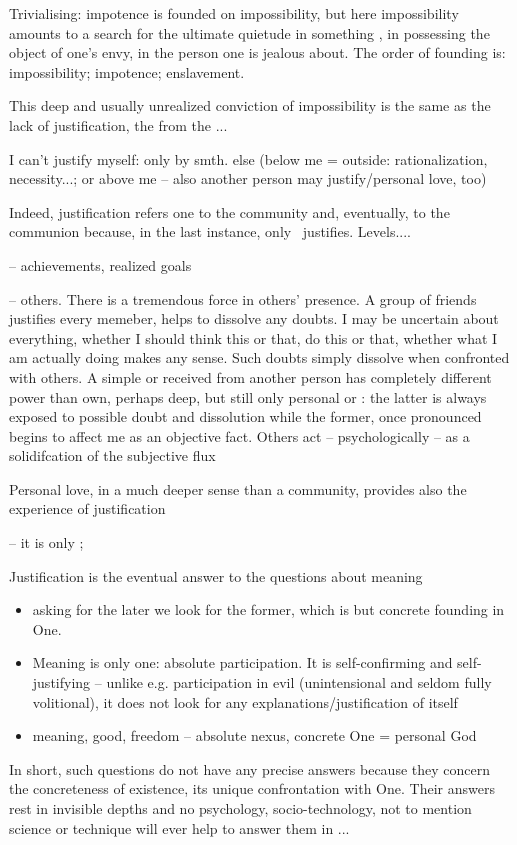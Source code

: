 Trivialising: impotence is founded on impossibility, but here impossibility
amounts to a search for the ultimate quietude in something , in
possessing the object of one's envy, in  the person one is
jealous about. The order of founding is: \inv impossibility; \mine impotence;
\act enslavement.

This deep and usually unrealized conviction of impossibility is the same as the
lack of justification, the  from the ...


\pa
I can't justify myself: only by smth. else (below me = outside: rationalization,
necessity...; or above me -- also another person may justify/personal love, too)

Indeed, justification refers one to the community and, eventually, to the
communion because, in the last instance, only \yes\ justifies. Levels....

\act -- achievements, realized goals

\mine -- others. There is a tremendous force in others' presence. A group of
friends justifies every memeber, helps to dissolve any doubts. I may be
uncertain about everything, whether I should think this or that, do this or
that, whether what I am actually doing makes any sense. Such doubts simply
dissolve when confronted with others. A simple  or  received from
another person has completely different power than  own, perhaps deep,
but still only personal  or : the latter is always exposed to
possible doubt and dissolution while the former, once pronounced begins to
affect me as an objective fact. Others act -- psychologically -- as a
solidifcation of the subjective flux

Personal love, in a much deeper sense than a community, provides also the
experience of justification

\inv -- it is only \Yes; 

\pa
Justification is the eventual answer to the questions about meaning
\begin{itemize}
  \item asking
for the later we look for the former, which is but concrete founding in
One.
\item Meaning is only one: absolute participation. It is self-confirming and
self-justifying -- unlike e.g. participation in evil (unintensional and seldom
fully volitional), it does not look for any explanations/justification of itself 
\item
meaning, good, freedom -- absolute nexus, concrete One = personal God
\end{itemize}
In short, such questions do not have any precise answers because they concern
the concreteness of existence, its unique confrontation with One. Their answers
rest in invisible depths and no psychology, socio-technology, not to mention
science or technique will ever help to answer them in ...


